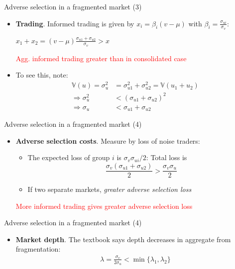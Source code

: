\documentclass[english,10pt
,aspectratio=169
]{beamer}
\begin{document}
\begin{frame}{Adverse selection in a fragmented market (3)}
	\begin{itemize}
		\item \textbf{Trading}. Informed trading is given by $x_i= \beta_i (v-\mu)$ with $\beta_i= \frac{\sigma_{ui}}{\sigma_{v}}$:
		\begin{center}
			$
			x_1+x_2=(v-\mu)\frac{\sigma_{u1}+\sigma_{u2}}{\sigma_v}>x
			$
		\end{center}
		\textcolor{red}{Agg. informed trading greater than in consolidated case}
		
		\item To see this, note: 
		\begin{align*}
		\mathbb{V}(u) = \sigma_u^2 &= \sigma_{u1}^2 + \sigma_{u2}^2 = \mathbb{V}(u_1+u_2)
		\\
		\Rightarrow
		\sigma_u^2 &< (\sigma_{u1} + \sigma_{u2})^2
		\\
		\Rightarrow
		\sigma_u &< \sigma_{u1} + \sigma_{u2}
		\end{align*}
	\end{itemize}
\end{frame}


\begin{frame}{Adverse selection in a fragmented market (4)}
	\begin{itemize}
		\item \textbf{Adverse selection costs}. Measure by loss of noise traders:
		\begin{itemize}
			\item The expected loss of group $i$ is $\sigma_{v} \sigma_{ui}/2$: Total loss is 
			\[
			\frac{\sigma_{v}(\sigma_{u1}+\sigma_{u2})}{2} > \frac{\sigma_{v} \sigma_{u}}{2}
			\]
			\item If two separate markets, \textit{greater adverse selection loss}
		\end{itemize}
		\textcolor{red}{More informed trading gives greater adverse selection loss}
	\end{itemize}
\end{frame}


\begin{frame}{Adverse selection in a fragmented market (4)}
	\begin{itemize}
		\item \textbf{Market depth}. The textbook says depth decreases in aggregate from fragmentation:
		\begin{align*}
		\lambda = \frac{\sigma_v}{2 \sigma_u} < \min \{ \lambda_1, \lambda_2 \}
		\end{align*}
	\end{itemize}
\end{frame}
\end{document}
